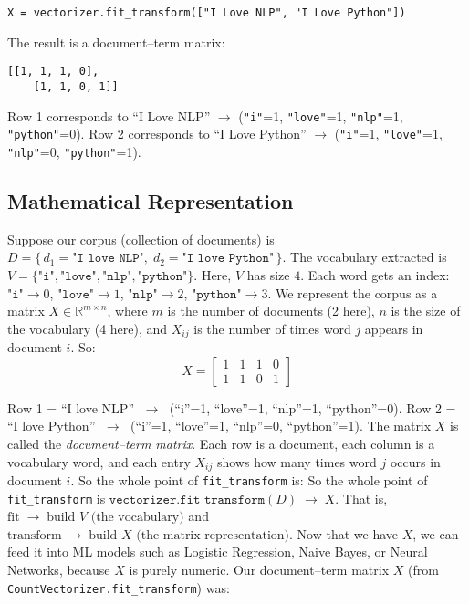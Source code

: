 \begin{lstlisting}[caption=Using fit\_transform directly]
	X = vectorizer.fit_transform(["I Love NLP", "I Love Python"])
\end{lstlisting}

The result is a document--term matrix:

\begin{lstlisting}[caption=Matrix representation of the corpus]
	[[1, 1, 1, 0], 
	[1, 1, 0, 1]]
\end{lstlisting}

Row 1 corresponds to ``I Love NLP'' $\rightarrow$ (\texttt{"i"}=1, \texttt{"love"}=1, \texttt{"nlp"}=1, \texttt{"python"}=0).  
Row 2 corresponds to ``I Love Python'' $\rightarrow$ (\texttt{"i"}=1, \texttt{"love"}=1, \texttt{"nlp"}=0, \texttt{"python"}=1).


\subsection{Mathematical Representation}
Suppose our corpus (collection of documents) is 
$D = \{\, d_{1} = \texttt{"I love NLP"}, \; d_{2} = \texttt{"I love Python"} \,\}$. 
The vocabulary extracted is 
$V = \{\texttt{"i"}, \texttt{"love"}, \texttt{"nlp"}, \texttt{"python"}\}$. 
Here, $V$ has size $4$. Each word gets an index: 
$\texttt{"i"} \rightarrow 0$, 
$\texttt{"love"} \rightarrow 1$, 
$\texttt{"nlp"} \rightarrow 2$, 
$\texttt{"python"} \rightarrow 3$. We represent the corpus as a matrix $X \in \mathbb{R}^{m \times n}$, where 
$m$ is the number of documents (2 here), $n$ is the size of the vocabulary (4 here), 
and $X_{ij}$ is the number of times word $j$ appears in document $i$. So:
\[
X =
\begin{bmatrix}
	1 & 1 & 1 & 0 \\
	1 & 1 & 0 & 1
\end{bmatrix}
\]

Row 1 = ``I love NLP'' $\;\rightarrow\;$ (``i''=1, ``love''=1, ``nlp''=1, ``python''=0).  
Row 2 = ``I love Python'' $\;\rightarrow\;$ (``i''=1, ``love''=1, ``nlp''=0, ``python''=1). The matrix $X$ is called the \emph{document--term matrix}. Each row is a document, each column is a vocabulary word, 
and each entry $X_{ij}$ shows how many times word $j$ occurs in document $i$. So the whole point of \texttt{fit\_transform} is:
So the whole point of \texttt{fit\_transform} is 
$\texttt{vectorizer.fit\_transform}(D) \;\longrightarrow\; X$. 
That is, $\text{fit} \;\longrightarrow\; \text{build } V \text{ (the vocabulary)}$ 
and $\text{transform} \;\longrightarrow\; \text{build } X \text{ (the matrix representation)}$. Now that we have $X$, we can feed it into ML models such as Logistic Regression, Naive Bayes, or Neural Networks, 
because $X$ is purely numeric. Our document--term matrix $X$ (from \texttt{CountVectorizer.fit\_transform}) was:

